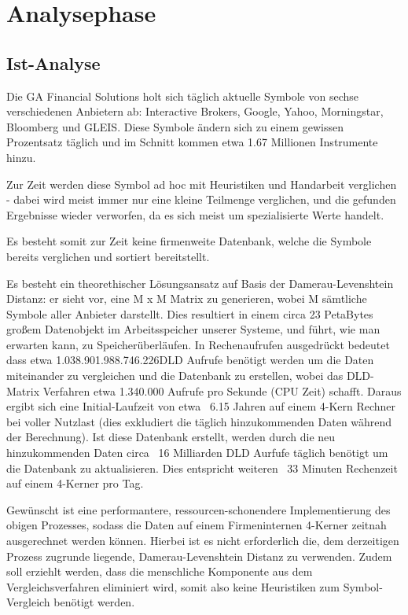 \section{Analysephase}
\subsection{Ist-Analyse}
Die GA Financial Solutions holt sich täglich aktuelle Symbole von sechse verschiedenen
Anbietern ab: Interactive Brokers\cite{IB}, Google, Yahoo, Morningstar, Bloomberg und GLEIS.
Diese Symbole ändern sich zu einem gewissen Prozentsatz täglich und im Schnitt kommen etwa
1.67 Millionen Instrumente hinzu.\par

Zur Zeit werden diese Symbol ad hoc mit Heuristiken und Handarbeit verglichen -
dabei wird meist immer nur eine kleine Teilmenge verglichen, und die gefunden Ergebnisse
wieder verworfen, da es sich meist um spezialisierte Werte handelt.\par

Es besteht somit zur Zeit keine firmenweite Datenbank, welche die Symbole
bereits verglichen und sortiert bereitstellt.\par

Es besteht ein theorethischer Lösungsansatz auf Basis der Damerau-Levenshtein Distanz\footnotemark:
er sieht vor, eine M x M Matrix zu generieren, wobei M sämtliche Symbole aller
Anbieter darstellt. Dies resultiert in einem circa 23 PetaBytes großem Datenobjekt
im Arbeitsspeicher unserer Systeme, und führt, wie man erwarten kann, zu Speicherüberläufen.
In Rechenaufrufen ausgedrückt bedeutet dass etwa 1.038.901.988.746.226\footnotemark DLD Aufrufe
benötigt werden um die Daten miteinander zu vergleichen und die Datenbank zu erstellen,
wobei das DLD-Matrix Verfahren etwa 1.340.000 Aufrufe pro Sekunde (CPU Zeit) schafft.
Daraus ergibt sich eine Initial-Laufzeit von etwa ~6.15 Jahren auf einem 4-Kern
Rechner bei voller Nutzlast (dies exkludiert die täglich hinzukommenden Daten
während der Berechnung). Ist diese Datenbank erstellt, werden durch die neu
hinzukommenden Daten circa ~16 Milliarden DLD Aurfufe täglich benötigt um die
Datenbank zu aktualisieren. Dies entspricht weiteren ~33 Minuten Rechenzeit auf
einem 4-Kerner pro Tag.\par

Gewünscht ist eine performantere, ressourcen-schonendere Implementierung des obigen Prozesses,
sodass die Daten auf einem Firmeninternen 4-Kerner zeitnah ausgerechnet werden können.
Hierbei ist es nicht erforderlich die, dem derzeitigen Prozess zugrunde liegende,
Damerau-Levenshtein Distanz zu verwenden. Zudem soll erziehlt werden, dass die
menschliche Komponente aus dem Vergleichsverfahren eliminiert wird,
somit also keine Heuristiken zum Symbol-Vergleich benötigt werden.\par


